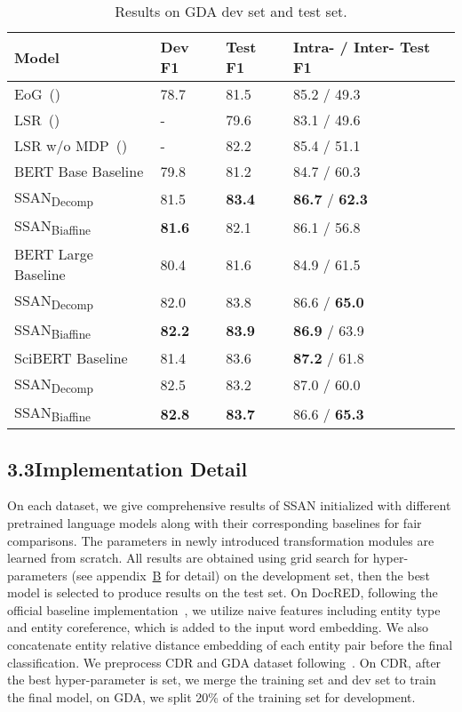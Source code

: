 \documentclass[letterpaper]{article} \usepackage{aaai21}  \usepackage{times}  \usepackage{helvet} \usepackage{courier}  \usepackage[hyphens]{url}  \usepackage{graphicx} \usepackage{booktabs}
\begin{document}
\begin{table}[t!]
\centering
\begin{tabular*}{0.48\textwidth}{@{}L{3.2cm}C{10mm}C{10mm}C{21mm}@{}}
\toprule
\textbf{Model}&\textbf{Dev F1}&\textbf{Test F1}&\textbf{Intra- / Inter- Test F1}\\
\midrule
EoG~(\citeyear{christopoulou-etal-2019-connecting})&78.7&81.5&85.2 / 49.3\\
LSR~(\citeyear{nan-etal-2020-reasoning})&-&79.6&83.1 / 49.6\\
LSR w/o MDP~(\citeyear{nan-etal-2020-reasoning})&-&82.2&85.4 / 51.1\\
\midrule
\midrule
BERT Base Baseline&79.8&81.2&84.7 / 60.3\\
SSAN\textsubscript{Decomp}&81.5&\textbf{83.4}&\textbf{86.7} / \textbf{62.3}\\
SSAN\textsubscript{Biaffine}&\textbf{81.6}&82.1&86.1 / 56.8\\
\midrule
BERT Large Baseline&80.4&81.6&84.9 / 61.5\\
SSAN\textsubscript{Decomp}&82.0&83.8&86.6 / \textbf{65.0}\\
SSAN\textsubscript{Biaffine}&\textbf{82.2}&\textbf{83.9}&\textbf{86.9} / 63.9\\
\midrule
SciBERT Baseline&81.4&83.6&\textbf{87.2} / 61.8\\
SSAN\textsubscript{Decomp}&82.5&83.2&87.0 / 60.0\\
SSAN\textsubscript{Biaffine}&\textbf{82.8}&\textbf{83.7}&86.6 / \textbf{65.3}\\
\bottomrule
\end{tabular*}
\caption{Results on GDA dev set and test set.}
\label{GDA}
\end{table}


\subsection{3.3\quad Implementation Detail}
On each dataset, we give comprehensive results of SSAN initialized with different pretrained language models along with their corresponding baselines for fair comparisons.
The parameters in newly introduced transformation modules are learned from scratch.
All results are obtained using grid search for hyper-parameters (see appendix~\hyperref[appendix:b]{B} for detail) on the development set, then the best model is selected to produce results on the test set.
On DocRED, following the official baseline implementation~\cite{yao-etal-2019-docred}, we utilize naive features including entity type and entity coreference, which is added to the input word embedding. We also concatenate entity relative distance embedding of each entity pair before the final classification.
We preprocess CDR and GDA dataset following~\citet{christopoulou-etal-2019-connecting}. On CDR, after the best hyper-parameter is set, we merge the training set and dev set to train the final model, on GDA, we split 20\% of the training set for development.
\end{document}
